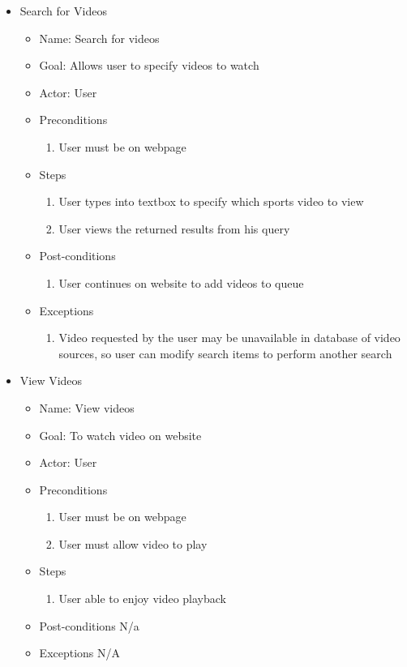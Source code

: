 \begin{itemize}
\item Search for Videos
	\begin{itemize}
	\item Name: Search for videos 
    \item Goal: Allows user to specify videos to watch
    \item Actor: User
    \item Preconditions
		\begin{enumerate}
		\item User must be on webpage
        \end{enumerate}
    \item Steps
    	\begin{enumerate}
		\item User types into textbox to specify which sports video to view
        \item User views the returned results from his query
        \end{enumerate}
    \item Post-conditions
    	\begin{enumerate}
		\item User continues on website to add videos to queue
        \end{enumerate}
    \item Exceptions
    	\begin{enumerate}
        \item Video requested by the user may be unavailable in database of video sources, so user can modify search items to perform another search
    	\end{enumerate}
    \end{itemize}

\item View Videos
	\begin{itemize}
	\item Name: View videos 
    \item Goal: To watch video on website
    \item Actor: User
    \item Preconditions
		\begin{enumerate}
		\item User must be on webpage
        \item User must allow video to play
        \end{enumerate}
    \item Steps
    	\begin{enumerate}
		\item User able to enjoy video playback
        \end{enumerate}
    \item Post-conditions N/a
    \item Exceptions N/A
    \end{itemize}
    

\end{itemize}
